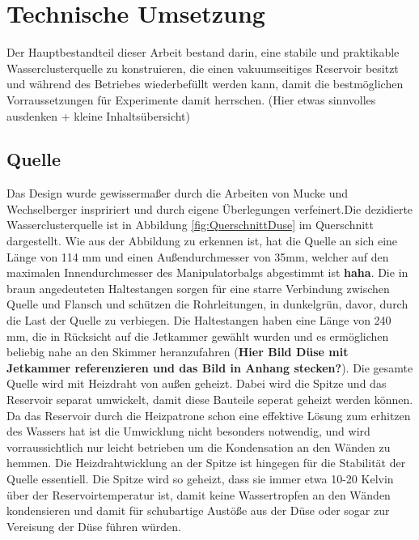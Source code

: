 \chapter{Technische Umsetzung} 

Der Hauptbestandteil dieser Arbeit bestand darin, eine stabile und praktikable Wasserclusterquelle zu konstruieren, die einen vakuumseitiges Reservoir besitzt und während des Betriebes wiederbefüllt werden kann, damit die bestmöglichen Vorraussetzungen für Experimente damit herrschen. (Hier etwas sinnvolles ausdenken + kleine Inhaltsübersicht)

\section{Quelle}

Das Design wurde gewissermaßer durch die Arbeiten von Mucke \cite{mucke2011} und Wechselberger \cite{wechselberger2014} inspririert und durch eigene Überlegungen verfeinert.Die dezidierte Wasserclusterquelle ist in Abbildung \ref{fig:QuerschnittDuse} im Querschnitt dargestellt. Wie aus der Abbildung zu erkennen ist, hat die Quelle an sich eine Länge von 114 mm und einen Außendurchmesser von 35mm, welcher auf den maximalen Innendurchmesser des Manipulatorbalgs abgestimmt ist \textbf{haha}. Die in braun angedeuteten Haltestangen sorgen für eine starre Verbindung zwischen Quelle und Flansch und schützen die Rohrleitungen, in dunkelgrün, davor, durch die Last der Quelle zu verbiegen. Die Haltestangen haben eine Länge von 240 mm, die in Rücksicht auf die Jetkammer gewählt wurden und es ermöglichen beliebig nahe an den Skimmer heranzufahren (\textbf{Hier Bild Düse mit Jetkammer referenzieren und das Bild in Anhang stecken?}). Die gesamte Quelle wird mit Heizdraht von außen geheizt. Dabei wird die Spitze und das Reservoir separat umwickelt, damit diese Bauteile seperat geheizt werden können. Da das Reservoir durch die Heizpatrone schon eine effektive Lösung zum erhitzen des Wassers hat ist die Umwicklung nicht besonders notwendig, und wird vorraussichtlich nur leicht betrieben um die Kondensation an den Wänden zu hemmen. Die Heizdrahtwicklung an der Spitze ist hingegen für die Stabilität der Quelle essentiell. Die Spitze wird so geheizt, dass sie immer etwa 10-20 Kelvin über der Reservoirtemperatur ist, damit keine Wassertropfen an den Wänden kondensieren und damit für schubartige Austöße aus der Düse oder sogar zur Vereisung der Düse führen würden.

